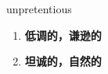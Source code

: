 
\begin{frame}
{\huge unpretentious}
\begin{center}
\begin{enumerate}\Large
  \item \textbf{低调的，谦逊的}
  \item \textbf{坦诚的，自然的}
\end{enumerate}
\end{center}
\end{frame}
